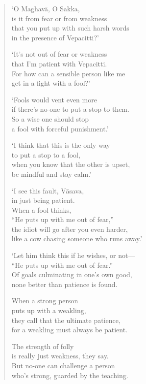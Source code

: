 \documentclass[12pt,openany]{book}%
\begin{document}
\begin{verse}%
‘O \textsanskrit{Maghavā}, O Sakka, \\
is it from fear or from weakness \\
that you put up with such harsh words \\
in the presence of Vepacitti?’ 

‘It’s not out of fear or weakness \\
that I’m patient with Vepacitti. \\
For how can a sensible person like me \\
get in a fight with a fool?’ 

‘Fools would vent even more \\
if there’s no-one to put a stop to them. \\
So a wise one should stop \\
a fool with forceful punishment.’ 

‘I think that this is the only way \\
to put a stop to a fool, \\
when you know that the other is upset, \\
be mindful and stay calm.’ 

‘I see this fault, \textsanskrit{Vāsava}, \\
in just being patient. \\
When a fool thinks, \\
“He puts up with me out of fear,” \\
the idiot will go after you even harder, \\
like a cow chasing someone who runs away.’ 

‘Let him think this if he wishes, or not—\\
“He puts up with me out of fear.” \\
Of goals culminating in one’s own good, \\
none better than patience is found. 

When a strong person \\
puts up with a weakling, \\
they call that the ultimate patience, \\
for a weakling must always be patient. 

The strength of folly \\
is really just weakness, they say. \\
But no-one can challenge a person \\
who’s strong, guarded by the teaching. 


\end{verse}
\end{document}
